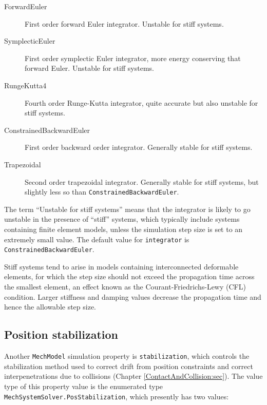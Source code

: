 \begin{description}

\item[ForwardEuler]\mbox{}

First order forward Euler integrator. Unstable for stiff systems.

\item[SymplecticEuler]\mbox{}

First order symplectic Euler integrator, more energy conserving
that forward Euler. Unstable for stiff systems.

\item[RungeKutta4]\mbox{}

Fourth order Runge-Kutta integrator, quite accurate but also unstable
for stiff systems.

\item[ConstrainedBackwardEuler]\mbox{}

First order backward order integrator. Generally stable for stiff systems.

\item[Trapezoidal]\mbox{}

Second order trapezoidal integrator. Generally stable for stiff
systems, but slightly less so than\pdfbreak
{\tt ConstrainedBackwardEuler}.

\end{description}

The term ``Unstable for stiff systems'' means that the integrator is
likely to go unstable in the presence of ``stiff'' systems, which
typically include systems containing finite element models, unless the
simulation step size is set to an extremely small value.  The default
value for {\tt integrator} is {\tt ConstrainedBackwardEuler}.

\begin{sideblock}
Stiff systems tend to arise in models containing interconnected
deformable elements, for which the step size should not exceed the
propagation time across the smallest element, an effect known as the
Courant-Friedrichs-Lewy (CFL) condition. Larger stiffness and damping
values decrease the propagation time and hence the allowable step
size.
\end{sideblock}

\subsection{Position stabilization}

Another {\tt MechModel} simulation property is {\tt stabilization},
which controls the stabilization method used to correct drift from
position constraints and correct interpenetrations due to collisions
(Chapter \ref{ContactAndCollision:sec}).
The value type of this property value is the enumerated type {\tt
MechSystemSolver.PosStabilization}, which presently has two values:

